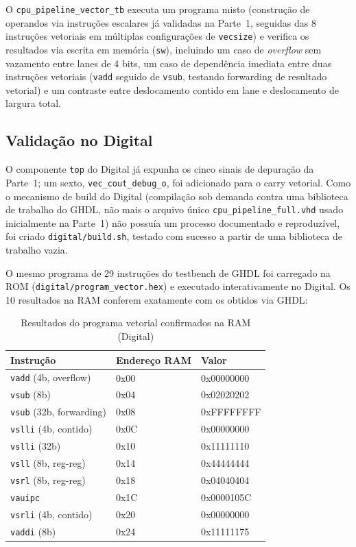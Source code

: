 \documentclass[12pt, a4paper]{article}
\newcommand{\code}[1]{\texttt{#1}}
\begin{document}
O \code{cpu\_pipeline\_vector\_tb} executa um programa misto
(construção de operandos via instruções escalares já validadas na
Parte~1, seguidas das 8 instruções vetoriais em múltiplas configurações
de \code{vecsize}) e verifica os resultados via escrita em memória
(\code{sw}), incluindo um caso de \emph{overflow} sem vazamento entre
lanes de 4 bits, um caso de dependência imediata entre duas instruções
vetoriais (\code{vadd} seguido de \code{vsub}, testando forwarding de
resultado vetorial) e um contraste entre deslocamento contido em lane e
deslocamento de largura total.

\subsection{Validação no Digital}

O componente \code{top} do Digital já expunha os cinco sinais de
depuração da Parte~1; um sexto, \code{vec\_cout\_debug\_o}, foi
adicionado para o carry vetorial. Como o mecanismo de build do Digital
(compilação sob demanda contra uma biblioteca de trabalho do GHDL, não
mais o arquivo único \code{cpu\_pipeline\_full.vhd} usado inicialmente
na Parte~1) não possuía um processo documentado e reproduzível, foi
criado \code{digital/build.sh}, testado com sucesso a partir de uma
biblioteca de trabalho vazia.

O mesmo programa de 29 instruções do testbench de GHDL foi carregado na
ROM (\code{digital/program\_vector.hex}) e executado interativamente no
Digital. Os 10 resultados na RAM conferem exatamente com os obtidos via
GHDL:

\begin{table}[H]
  \centering
  \caption{Resultados do programa vetorial confirmados na RAM (Digital)}
  \small{}
  \begin{tabular}{lll}
    \toprule
    \rowcolor{headerblue}
    \color{white}\textbf{Instrução} & \color{white}\textbf{Endereço RAM} &
    \color{white}\textbf{Valor} \\
    \midrule
    \code{vadd} (4b, overflow)      & 0x00 & 0x00000000 \\
    \code{vsub} (8b)                & 0x04 & 0x02020202 \\
    \code{vsub} (32b, forwarding)   & 0x08 & 0xFFFFFFFF \\
    \code{vslli} (4b, contido)      & 0x0C & 0x00000000 \\
    \code{vslli} (32b)              & 0x10 & 0x11111110 \\
    \code{vsll} (8b, reg-reg)       & 0x14 & 0x44444444 \\
    \code{vsrl} (8b, reg-reg)       & 0x18 & 0x04040404 \\
    \code{vauipc}                   & 0x1C & 0x0000105C \\
    \code{vsrli} (4b, contido)      & 0x20 & 0x00000000 \\
    \code{vaddi} (8b)               & 0x24 & 0x11111175 \\
    \bottomrule
  \end{tabular}
\end{table}
\end{document}
